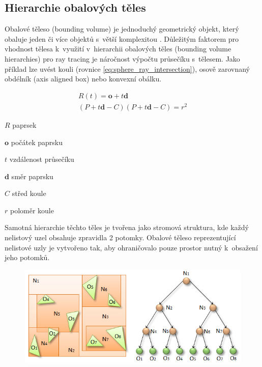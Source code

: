 \subsection{Hierarchie obalových těles} \label{sec:BVH}
Obalové těleso (bounding volume) je jednoduchý geometrický objekt, který obaluje jeden či více objektů s~větší komplexitou \cite{ericson_2005}. Důležitým faktorem pro vhodnost tělesa k~využití v~hierarchii obalových těles (bounding volume hierarchies) pro ray tracing je náročnost výpočtu průsečíku s~tělesem. Jako příklad lze uvést kouli (rovnice \ref{eq:sphere_ray_intersection}), osově zarovnaný obdélník (axis aligned box) nebo konvexní obálku.

\begin{equation} \label{eq:sphere_ray_intersection}
	\begin{gathered}
	    R(t) = \textbf{o} + t\textbf{d}  \\
	    
	    (P + t\textbf{d} - C) (P + t\textbf{d} - C) = r^2
	    
	\end{gathered}
\end{equation}

\begin{eqexpl}[60mm]
\item{$R$} paprsek
\item{$\textbf{o}$} počátek paprsku
\item{$t$} vzdálenost průsečíku
\item{$\textbf{d}$} směr paprsku
\item{$C$} střed koule
\item{$r$} poloměr koule
\end{eqexpl}

Samotná hierarchie těchto těles je tvořena jako stromová struktura, kde každý nelistový uzel obsahuje zpravidla 2 potomky. Obalové těleso reprezentující nelistové uzly je vytvořeno tak, aby ohraničovalo pouze prostor nutný k~obsažení jeho potomků.

\begin{figure}[H]
	\centering
	\includegraphics[scale=0.5]{images/fig03-bvh.png}
	\captionsetup{justification=centering}
	\label{fig:slabs}
\end{figure}

